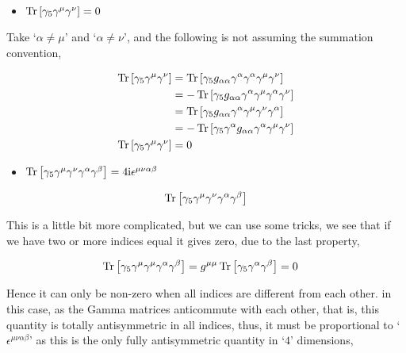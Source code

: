 \begin{itemize}
    \item $\Tr\qty[\gamma_5\gamma^\mu\gamma^\nu]=0$
\end{itemize}

Take `$\alpha\neq \mu$' and `$\alpha\neq \nu$', and the following is not assuming the summation 
convention,

\begin{align}
    \Tr\qty[\gamma_5\gamma^\mu\gamma^\nu]&=\Tr\qty[\gamma_5g_{\alpha\alpha}\gamma^\alpha\gamma^\alpha\gamma^\mu\gamma^\nu]\nonumber\\
    &=-\Tr\qty[\gamma_5g_{\alpha\alpha}\gamma^\alpha\gamma^\mu\gamma^\alpha\gamma^\nu]\nonumber\\
    &=\Tr\qty[\gamma_5g_{\alpha\alpha}\gamma^\alpha\gamma^\mu\gamma^\nu\gamma^\alpha]\nonumber\\
    &=-\Tr\qty[\gamma_5\gamma^\alpha g_{\alpha\alpha}\gamma^\alpha\gamma^\mu\gamma^\nu]\nonumber\\
    \Tr\qty[\gamma_5\gamma^\mu\gamma^\nu]&=0\nonumber
\end{align}

\begin{itemize}
    \item $\Tr\qty[\gamma_5\gamma^\mu\gamma^\nu\gamma^\alpha\gamma^\beta]=4\textnormal{i}\epsilon^{\mu\nu\alpha\beta}$
\end{itemize}

\begin{align}
    \Tr\qty[\gamma_5\gamma^\mu\gamma^\nu\gamma^\alpha\gamma^\beta]
\end{align}

This is a little bit more complicated, but we can use some tricks, we see that if we have two or more indices 
equal it gives zero, due to the last property,

\begin{align}
    \Tr\qty[\gamma_5\gamma^\mu\gamma^\mu\gamma^\alpha\gamma^\beta]&=g^{\mu\mu}\Tr\qty[\gamma_5\gamma^\alpha\gamma^\beta]=0\nonumber
\end{align}

Hence it can only be non-zero when all indices are different from each other. in this case, as the Gamma matrices 
anticommute with each other, that is, this quantity is totally antisymmetric in all indices, thus, it must 
be proportional to `$\epsilon^{\mu\nu\alpha\beta}$' as this is the only fully antisymmetric quantity in `$4$' 
dimensions,

